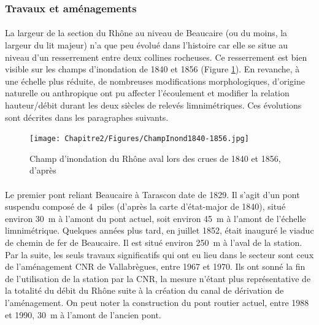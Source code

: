 \FloatBarrier

		\subsubsection{Travaux et aménagements}
    	\label{subsubsec:TravauxPt}
    
    \paragraph{} La largeur de la section du Rhône au niveau de Beaucaire (ou du moins, la largeur du lit majeur) n'a que peu évolué dans l'histoire car elle se situe au niveau d'un resserrement entre deux collines rocheuses. Ce resserrement est bien visible sur les champs d'inondation de 1840 et 1856 (Figure \ref{Champ1856}). En revanche, à une échelle plus réduite, de nombreuses modifications morphologiques, d'origine naturelle ou anthropique ont pu affecter l'écoulement et modifier la relation hauteur/débit durant les deux siècles de relevés limnimétriques. Ces évolutions sont décrites dans les paragraphes suivants.
        
    \begin{figure}[h]
        \centering
        \texttt{[image: Chapitre2/Figures/ChampInond1840-1856.jpg]}
        \caption{Champ d'inondation du Rhône aval lors des crues de 1840 et 1856, d'après \citet{parde_regime_1925}}
        \label{Champ1856}
    \end{figure}
    

	\paragraph{} Le premier pont reliant Beaucaire à Tarascon date de 1829. Il s'agit d'un pont suspendu composé de 4~piles (d'après la carte d'état-major de 1840), situé environ 30~m à l'amont du pont actuel, soit environ 45~m à l'amont de l'échelle limnimétrique. Quelques années plus tard, en juillet 1852, était inauguré le viaduc de chemin de fer de Beaucaire. Il est situé environ 250~m à l'aval de la station. Par la suite, les seuls travaux significatifs qui ont eu lieu dans le secteur sont ceux de l'aménagement CNR de Vallabrègues, entre 1967 et 1970. Ils ont sonné la fin de l'utilisation de la station par la CNR, la mesure n'étant plus représentative de la totalité du débit du Rhône suite à la création du canal de dérivation de l'aménagement. On peut noter la construction du pont routier actuel, entre 1988 et 1990, 30~m à l'amont de l'ancien pont. 
        

